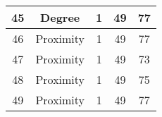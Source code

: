 \documentclass[results.tex]{subfiles}
\begin{document}
\begin{center}
\begin{tabular}{| c || c | c | c | c |}
            \hline
            45                      & Degree                       & 1                      & 49                      & 77                   \\
            \hline
            46                      & Proximity                    & 1                      & 49                      & 77                   \\
            \hline
            47                      & Proximity                    & 1                      & 49                      & 73                   \\
            \hline
            48                      & Proximity                    & 1                      & 49                      & 75                   \\
            \hline
            49                      & Proximity                    & 1                      & 49                      & 77                   \\
            \hline
        \end{tabular}
    \end{center}
\end{document}
